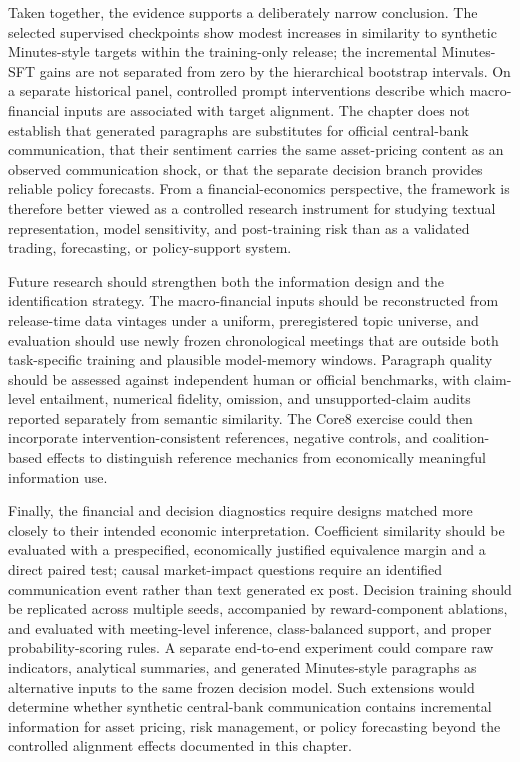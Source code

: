 Taken together, the evidence supports a deliberately narrow conclusion.
The selected supervised checkpoints show modest increases in similarity to
synthetic Minutes-style targets within the training-only release; the
incremental Minutes-SFT gains are not separated from zero by the
hierarchical bootstrap intervals. On a separate historical panel, controlled
prompt interventions describe which macro-financial inputs are associated
with target alignment. The chapter does not establish that generated
paragraphs are substitutes for official central-bank communication, that their
sentiment carries the same asset-pricing content as an observed communication
shock, or that the separate decision branch provides reliable policy forecasts.
From a financial-economics perspective, the framework is therefore better
viewed as a controlled research instrument for studying textual representation,
model sensitivity, and post-training risk than as a validated trading,
forecasting, or policy-support system.

Future research should strengthen both the information design and the
identification strategy. The macro-financial inputs should be reconstructed
from release-time data vintages under a uniform, preregistered topic universe,
and evaluation should use newly frozen chronological meetings that are outside
both task-specific training and plausible model-memory windows. Paragraph
quality should be assessed against independent human or official benchmarks,
with claim-level entailment, numerical fidelity, omission, and unsupported-claim
audits reported separately from semantic similarity. The Core8 exercise could
then incorporate intervention-consistent references, negative controls, and
coalition-based effects to distinguish reference mechanics from economically
meaningful information use.

Finally, the financial and decision diagnostics require designs matched more
closely to their intended economic interpretation. Coefficient similarity
should be evaluated with a prespecified, economically justified equivalence
margin and a direct paired test; causal market-impact questions require an
identified communication event rather than text generated ex post. Decision
training should be replicated across multiple seeds, accompanied by
reward-component ablations, and evaluated with meeting-level inference,
class-balanced support, and proper probability-scoring rules. A separate
end-to-end experiment could compare raw indicators, analytical summaries, and
generated Minutes-style paragraphs as alternative inputs to the same frozen
decision model. Such extensions would determine whether synthetic
central-bank communication contains incremental information for asset pricing,
risk management, or policy forecasting beyond the controlled alignment effects
documented in this chapter.
